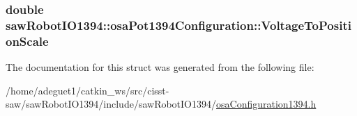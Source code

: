 \hypertarget{structsaw_robot_i_o1394_1_1osa_pot1394_configuration_adc6b92026b60d4e3dd108a6acc805e4c}{
\subsubsection[{Voltage\-To\-Position\-Scale}]{\setlength{\rightskip}{0pt plus 5cm}double saw\-Robot\-I\-O1394\-::osa\-Pot1394\-Configuration\-::\-Voltage\-To\-Position\-Scale}}\label{structsaw_robot_i_o1394_1_1osa_pot1394_configuration_adc6b92026b60d4e3dd108a6acc805e4c}


The documentation for this struct was generated from the following file\-:\begin{DoxyCompactItemize}
\item 
/home/adeguet1/catkin\-\_\-ws/src/cisst-\/saw/saw\-Robot\-I\-O1394/include/saw\-Robot\-I\-O1394/\hyperlink{osa_configuration1394_8h}{osa\-Configuration1394.\-h}\end{DoxyCompactItemize}

